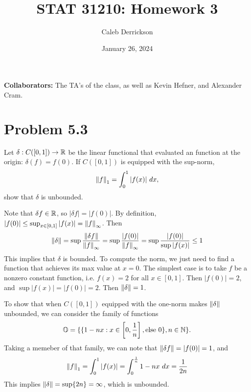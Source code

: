 

\title{STAT 31210: Homework 3}
\author{Caleb Derrickson}
\date{January 26, 2024}


\onehalfspacing
\maketitle
\allowdisplaybreaks
{\color{cit}\vspace{2mm}\noindent\textbf{Collaborators:}} The TA's of the class, as well as Kevin Hefner, and Alexander Cram.

\tableofcontents

\newpage
\section{Problem 5.3}
Let $\delta: C([0, 1]) \rightarrow \mathbb{R}$ be the linear functional that evaluated an function at the origin: $\delta(f) = f(0)$. If $C([0, 1])$ is equipped with the sup-norm,
\[\norm{f}_1 = \int_0^1 |f(x)| \ dx,\]
show that $\delta$ is unbounded.
\partbreak
\begin{solution}
    
    Note that $\delta f \in \mathbb{R}$, so $|\delta f| = |f(0)|$. By definition, $|f(0)| \leq \sup_{x \in [0, 1]} |f(x)| = \norm{f}_\infty$. Then 
    \[
   \norm{\delta} = \sup \frac{\norm{\delta f}}{\norm{f}_\infty} = \sup \frac{|f(0)|}{\norm{f}_\infty} = \sup \frac{|f(0)|}{\sup |f(x)|} \leq 1
    \]
    This implies that $\delta$ is bounded. To compute the norm, we just need to find a function that achieves its max value at $x = 0$. The simplest case is to take $f$ be a nonzero constant function, i.e. $f(x) = 2$ for all $x \in [0, 1]$. Then $|f(0)| = 2$, and $\sup |f(x)| = |f(0)| = 2$. Then $\norm{\delta} = 1$.
    \par
    
    \jump
    To show that when $C([0, 1])$ equipped with the one-norm makes $\norm{\delta}$ unbounded, we can consider the family of functions 
    \[\mathbb{O} = \{ \{1 - nx : x \in \left[0, \frac{1}{n}\right], \text{else } 0\}, n \in \mathbb{N}\}.\]
    Taking a memeber of that family, we can note that $\norm{\delta f} = |f(0)| = 1$, and
    \[\norm{f}_1 = \int_0^1 |f(x)| = \int_0^\frac{1}{n} 1 - nx \ dx = \frac{1}{2n}\]
    This implies $\norm{\delta} = \sup \{2n\} = \infty$, which is unbounded. 
\end{solution}

